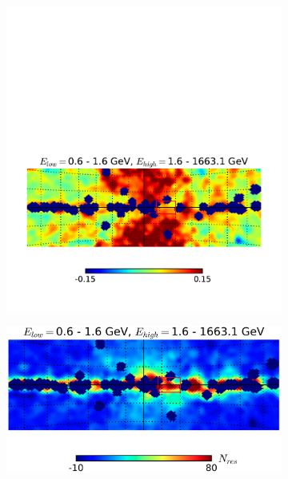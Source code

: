 \documentclass[a4paper]{article}
\begin{document}
\begin{figure}[H]
{\begin{subfigure}[b]{.5\textwidth}
		\includegraphics[width=.95\textwidth]{gnomview_highEsmooth}
	\end{subfigure}%
	\begin{subfigure}[b]{.5\textwidth}
		\centering
		\includegraphics[width=.95\textwidth]{gnomview_highEsmooth_nonorm}
	\end{subfigure}%
	}\\
\end{figure}
\end{document}
